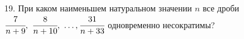 19. При каком наименьшем натуральном значении $n$ все дроби $\cfrac{7}{n+9},\ \cfrac{8}{n+10},\ \ldots, \cfrac{31}{n+33}$ одновременно несократимы?\\
